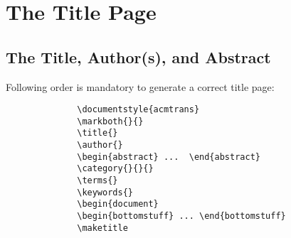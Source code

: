 \documentclass[hyperref]{acmtrans2e}
\begin{document}
\section{The Title Page}

\subsection{The Title, Author(s), and Abstract}

Following order is mandatory to generate a correct title page:

\begin{verbatim}
		      \documentstyle{acmtrans}
		      \markboth{}{}
		      \title{}
		      \author{}
		      \begin{abstract} ...  \end{abstract}
		      \category{}{}{}
		      \terms{} 
		      \keywords{}
		      \begin{document}
		      \begin{bottomstuff} ... \end{bottomstuff}
		      \maketitle
\end{verbatim}
\end{document}
